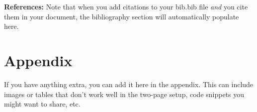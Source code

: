 \documentclass{article}\usepackage[]{graphicx}\usepackage[]{xcolor}
\begin{document}
\begin{multicols}{2}
\vspace{2em}

\noindent\textbf{References:} Note that when you add citations to your bib.bib file \emph{and}
you cite them in your document, the bibliography section will automatically populate here.

\begin{tiny}

\end{tiny}
\end{multicols}

\newpage
\onecolumn
\section{Appendix}

If you have anything extra, you can add it here in the appendix. This can include images or tables that don't work well in the two-page setup, code snippets you might want to share, etc.
\end{document}
